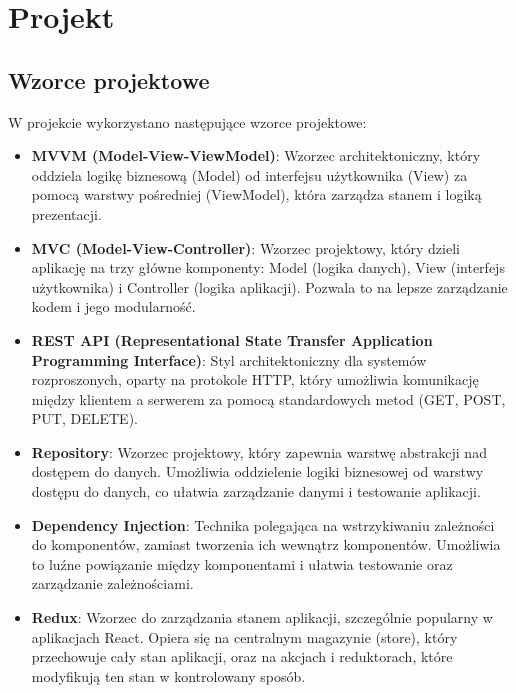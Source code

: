 
\chapter{Projekt}
\label{ch:projekt}

\section{Wzorce projektowe}\label{sec:wzorce-projektowe}
W projekcie wykorzystano następujące wzorce projektowe:
\begin{itemize}

    \item \textbf{MVVM (Model-View-ViewModel)}: Wzorzec architektoniczny, który oddziela logikę biznesową (Model) od interfejsu użytkownika (View) za pomocą warstwy pośredniej (ViewModel), która zarządza stanem i logiką prezentacji.

    \item \textbf{MVC (Model-View-Controller)}: Wzorzec projektowy, który dzieli aplikację na trzy główne komponenty: Model (logika danych), View (interfejs użytkownika) i Controller (logika aplikacji).
    Pozwala to na lepsze zarządzanie kodem i jego modularność.

    \item \textbf{REST API (Representational State Transfer Application Programming Interface)}: Styl architektoniczny dla systemów rozproszonych, oparty na protokole HTTP, który umożliwia komunikację między klientem a serwerem za pomocą standardowych metod (GET, POST, PUT, DELETE).

    \item \textbf{Repository}: Wzorzec projektowy, który zapewnia warstwę abstrakcji nad dostępem do danych.
    Umożliwia oddzielenie logiki biznesowej od warstwy dostępu do danych, co ułatwia zarządzanie danymi i testowanie aplikacji.

    \item \textbf{Dependency Injection}: Technika polegająca na wstrzykiwaniu zależności do komponentów, zamiast tworzenia ich wewnątrz komponentów.
    Umożliwia to luźne powiązanie między komponentami i ułatwia testowanie oraz zarządzanie zależnościami.

    \item \textbf{Redux}: Wzorzec do zarządzania stanem aplikacji, szczególnie popularny w aplikacjach React.
    Opiera się na centralnym magazynie (store), który przechowuje cały stan aplikacji, oraz na akcjach i reduktorach, które modyfikują ten stan w kontrolowany sposób.


\end{itemize}

